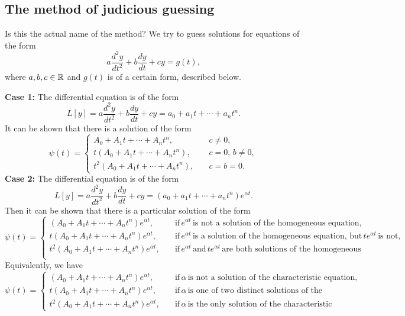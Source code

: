 \subsection{The method of judicious guessing}
Is this the actual name of the method? We try to guess solutions for equations of the form 
\begin{equation}\label{ncsode}
    a \frac{d^2y}{dt^2}+b \frac{dy}{dt}+cy=g(t),
\end{equation}
where $a,b,c\in \mathbb{R}$ and $g(t)$ is of a certain form, described below.

\vspace{0.25cm}
\noindent\textbf{Case 1:} The differential equation is of the form \[
    L[y]=a \frac{d^2y}{dt^2}+b \frac{dy}{dt}+cy=a_0+a_1t+\cdots +a_nt^n.
\] It can be shown that there is a solution of the form \[
\psi(t)=
\begin{cases}
    A_0+A_1t+\cdots+A_nt^n,&\quad c\neq 0,\\
    t(A_0+A_1t+\cdots+A_nt^n),&\quad c=0,\,b\neq 0,\\
    t^2(A_0+A_1t+\cdots+A_nt^n),&\quad c=b=0.
\end{cases}
\] 
\noindent\textbf{Case 2:} The differential equation is of the form \[
    L[y]=a  \frac{d^2y}{dt^2}+b \frac{dy}{dt}+cy=(a_0+a_1t+\cdots + a_nt^n)e^{\alpha t}.
\] Then it can be shown that there is a particular solution of the form \[
\psi(t)=
\begin{cases}
    (A_0+A_1t+\cdots+A_nt^n)e^{\alpha t},&\quad \text{if}\, e^{\alpha t}\, \text{is not a solution of the homogeneous equation,}\\
    t(A_0+A_1t+\cdots+A_nt^n)e^{\alpha t},&\quad \text{if}\, e^{\alpha t}\, \text{is a solution of the homogeneous equation, but}\,te^{\alpha t}\,\text{is not,}\\
    t^2(A_0+A_1t+\cdots+A_nt^n)e^{\alpha t},&\quad \text{if}\, e^{\alpha t}\, \text{and}\,te^{\alpha t}\,\text{are both solutions of the homogeneous equation.}\\
\end{cases}
\] Equivalently, we have\[
\psi(t)=
\begin{cases}
    (A_0+A_1t+\cdots+A_nt^n)e^{\alpha t},&\quad \text{if}\, \alpha\, \text{is not a solution of the characteristic equation,}\\
    t(A_0+A_1t+\cdots+A_nt^n)e^{\alpha t},&\quad \text{if}\, \alpha \, \text{is one of two distinct solutions of the characteristic,}\\
    t^2(A_0+A_1t+\cdots+A_nt^n)e^{\alpha t},&\quad \text{if}\, \alpha\, \text{is the only solution of the characteristic equation.}
\end{cases}
\] 
